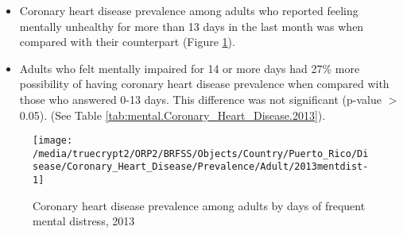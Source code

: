  \newpage
\begin{itemize}

\item Coronary heart disease prevalence among adults who reported feeling mentally unhealthy for more than 13 days in the last month was  when compared with their counterpart (Figure \ref{fig:mental.Coronary_Heart_Disease.2013}).


\item  Adults who felt mentally impaired for 14 or more days had 27\% more possibility of having coronary heart disease prevalence when compared with those who answered 0-13 days. This difference was not significant (p-value $>$ 0.05). (See Table \ref{tab:mental.Coronary_Heart_Disease.2013}).

\end{itemize}

\begin{figure}[H]
\centering
\caption{Coronary heart disease prevalence among adults by days of frequent mental distress, 2013}
\label{fig:mental.Coronary_Heart_Disease.2013}

\begin{knitrout}
\color{fgcolor}

{\centering \texttt{[image: /media/truecrypt2/ORP2/BRFSS/Objects/Country/Puerto\_Rico/Disease/Coronary\_Heart\_Disease/Prevalence/Adult/2013mentdist-1]} 

}



\end{knitrout}
 \end{figure}

